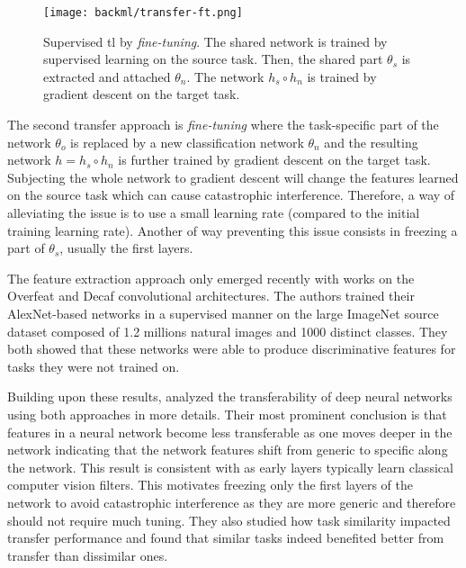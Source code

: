 \begin{figure}
  \centering
  \texttt{[image: backml/transfer-ft.png]}
  \caption{Supervised \acrlong{tl} by \textit{fine-tuning}. The shared network is trained by supervised learning on the source task. Then, the shared part $\theta_s$ is extracted and attached $\theta_n$. The network $h_s \circ h_n$ is trained by gradient descent on the target task.}
  \label{fig:backml:transfer-ft}
\end{figure}

The second transfer approach is \textit{fine-tuning} where the task-specific part of the network $\theta_{o}$ is replaced by a new classification network $\theta_{n}$ and the resulting network $h = h_s \circ h_n$ is further trained by gradient descent on the target task. Subjecting the whole network to gradient descent will change the features learned on the source task which can cause catastrophic interference. Therefore, a way of alleviating the issue is to use a small learning rate (compared to the initial training learning rate). Another of way preventing this issue consists in freezing a part of $\theta_s$, usually the first layers. 

The feature extraction approach only emerged recently with works on the Overfeat \parencite{sermanet2013overfeat, razavian2014cnn} and Decaf \parencite{donahue2014decaf} convolutional architectures. The authors trained their AlexNet-based networks in a supervised manner on the large ImageNet source dataset composed of 1.2 millions natural images and 1000 distinct classes. They both showed that these networks were able to produce discriminative features for tasks they were not trained on.

Building upon these results, \parencite{yosinski2014transferable} analyzed the transferability of deep neural networks using both approaches in more details. Their most prominent conclusion is that features in a neural network become less transferable as one moves deeper in the network indicating that the network features shift from generic to specific along the network. This result is consistent with \parencite{zeiler2014visualizing} as early layers typically learn classical computer vision filters. This motivates freezing only the first layers of the network to avoid catastrophic interference as they are more generic and therefore should not require much tuning. They also studied how task similarity impacted transfer performance and found that similar tasks indeed benefited better from transfer than dissimilar ones.

